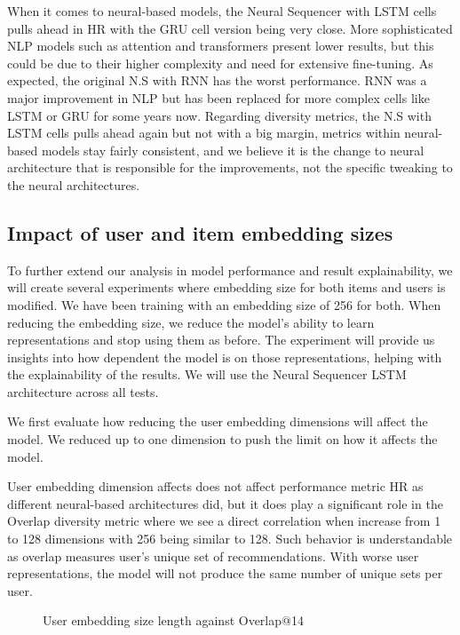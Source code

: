 \documentclass{tex_files/kththesis}
\begin{document}
When it comes to neural-based models, the Neural Sequencer with LSTM cells pulls ahead in HR with the GRU cell version being very close. More sophisticated NLP models such as attention and transformers present lower results, but this could be due to their higher complexity and need for extensive fine-tuning. As expected, the original N.S with RNN has the worst performance. RNN was a major improvement in NLP but has been replaced for more complex cells like LSTM or GRU for some years now. Regarding diversity metrics, the N.S with LSTM cells pulls ahead again but not with a big margin, metrics within neural-based models stay fairly consistent, and we believe it is the change to neural architecture that is responsible for the improvements, not the specific tweaking to the neural architectures. 

\subsection{Impact of user and item embedding sizes}
To further extend our analysis in model performance and result explainability, we will create several experiments where embedding size for both items and users is modified. We have been training with an embedding size of 256 for both. When reducing the embedding size, we reduce the model's ability to learn representations and stop using them as before. The experiment will provide us insights into how dependent the model is on those representations, helping with the explainability of the results. We will use the Neural Sequencer LSTM architecture across all tests.

We first evaluate how reducing the user embedding dimensions will affect the model. We reduced up to one dimension to push the limit on how it affects the model. 

\begin{center}

\end{center}

User embedding dimension affects does not affect performance metric HR as different neural-based architectures did, but it does play a significant role in the Overlap diversity metric where we see a direct correlation when increase from 1 to 128 dimensions with 256 being similar to 128. Such behavior is understandable as overlap measures user's unique set of recommendations. With worse user representations, the model will not produce the same number of unique sets per user.

\begin{figure}[H]
\centering
{}
\caption{User embedding size length against Overlap@14}
\end{figure}
\end{document}
